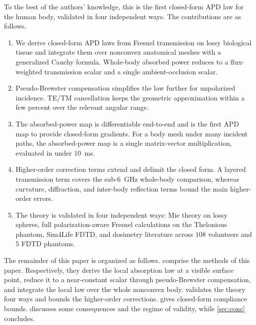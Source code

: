\documentclass[journal,twocolumn,10pt]{IEEEtran}
\begin{document}
To the best of the authors' knowledge, this is the first closed-form
\gls{APD} law for the human body, validated in four independent ways. The
contributions are as follows.
\begin{enumerate}
  \item We derive closed-form \gls{APD} laws from Fresnel transmission
  on lossy biological tissue and integrate them over nonconvex
  anatomical meshes with a generalized Cauchy formula. Whole-body
  absorbed power reduces to a flux-weighted transmission scalar and a
  single ambient-occlusion scalar.

  \item Pseudo-Brewster compensation simplifies the law further for
  unpolarized incidence. \gls{TE}/\gls{TM} cancellation keeps the
  geometric approximation within a few percent over the relevant
  angular range.

  \item The absorbed-power map is differentiable end-to-end and is the first
  \gls{APD} map to provide closed-form gradients. For a body mesh
  under many incident paths, the absorbed-power map is a single
  matrix-vector multiplication, evaluated in under $10$~ms.

  \item Higher-order correction terms extend and delimit the closed
  form. A layered transmission term covers the sub-6~GHz whole-body
  comparison, whereas curvature, diffraction, and inter-body reflection
  terms bound the main higher-order errors.

  \item The theory is validated in four independent ways: Mie theory
  on lossy spheres, full polarization-aware Fresnel calculations on
  the Thelonious phantom, Sim4Life FDTD, and dosimetry literature
  across $108$ volunteers and $5$ FDTD phantoms.
\end{enumerate}

The remainder of this paper is organized as follows.
 comprise the methods of this paper.
Respectively, they derive the local absorption law at a visible
surface point, reduce it to a near-constant scalar through
pseudo-Brewster compensation, and integrate the local law over the
whole nonconvex body.  validates the theory four ways
and bounds the higher-order corrections.  gives
closed-form compliance bounds.  discusses some
consequences and the regime of validity, while \cref{sec:conc}
concludes.
\end{document}
